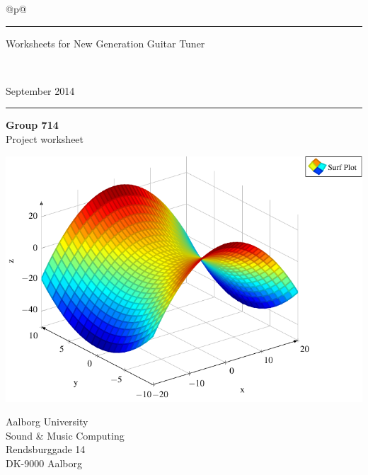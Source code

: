 \thispagestyle{empty}
\noindent%
\begin{tabular}{@{}p{\textwidth}@{}}
    \rule{\linewidth}{2mm}\vspace{1.5cm}
    \vspace*{-15mm}
    \begin{flushleft}
        \linespread{0.7}
        \fontsize{50}{60}\selectfont\fatfont
        Worksheets for
        New Generation
        Guitar Tuner
    \end{flushleft} \\[5mm] 
    \raggedright{
        \fontsize{30}{40}\selectfont\sffamily
        September 2014\\ \vspace*{1mm}
    }
    \rule{\linewidth}{.7mm}
\end{tabular}
\begin{flushleft}
  {\Huge\sffamily\bfseries
    Group 714
  }\\
  \vspace{0.2cm}
  {\LARGE\sffamily
    Project worksheet
  }
\end{flushleft}
\begin{center}
    \includegraphics[scale=.7]{img/frontpage}
\end{center}
\vfill
\begin{flushleft}\sffamily\large
  Aalborg University\\
  Sound \& Music Computing\\
  Rendsburggade 14\\
  DK-9000 Aalborg
\end{flushleft}
